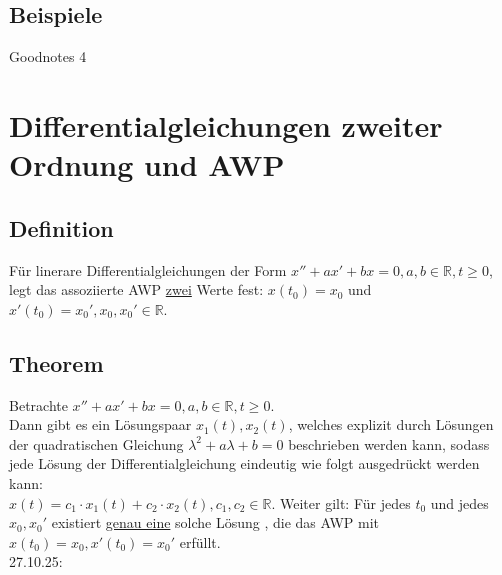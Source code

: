 \documentclass[12pt,a4paper]{article}
\newcommand{\DGL}{Differentialgleichung }
\newcommand{\DGLs}{Differentialgleichungen }
\newcommand{\Lsg}{Lösung }
\newcommand{\LSG}{Lösungen }
\begin{document}
\subsection{Beispiele}
Goodnotes 4
\section{\DGLs zweiter Ordnung und AWP}
\subsection{Definition}
Für linerare \DGLs der Form $x'' + ax' + bx = 0, a,b \in \mathbb{R}, t \geq 0$, legt das assoziierte AWP \underline{zwei} Werte fest: $x(t_0) = x_0$ und $x'(t_0) = x_0', x_0, x_0' \in \mathbb{R}$.
\subsection{Theorem}
Betrachte $x'' + ax' + bx = 0, a,b \in \mathbb{R}, t \geq 0$. \\
Dann gibt es ein Lösungspaar $x_1(t), x_2(t)$, welches explizit durch \LSG der quadratischen Gleichung $\lambda^2+a\lambda+b=0$ beschrieben werden kann, sodass jede \Lsg der \DGL eindeutig wie folgt ausgedrückt werden kann: \\
$x(t) = c_1 \cdot x_1(t) + c_2 \cdot x_2(t), c_1, c_2 \in \mathbb{R}$. Weiter gilt: Für jedes $t_0$ und jedes $x_0, x_0'$ existiert \underline{genau eine} solche \Lsg, die das AWP mit $x(t_0) = x_0, x'(t_0) = x_0'$ erfüllt. \\
27.10.25:
\end{document}
